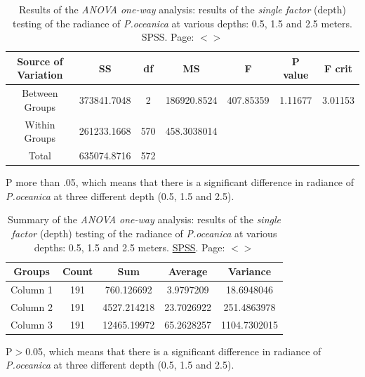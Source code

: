 \documentclass[11pt]{article}
\begin{document}
\begin{appendices}
\begin{table}[htbp]
	\caption{Results of the \textit{ANOVA one-way} analysis: results of the \textit{single factor} (depth) testing of the radiance of \textit{P.oceanica} at various depths: 0.5, 1.5 and 2.5 meters. \ac{SPSS}. Page: $<$\pageref{page-28}$>$}\label{tab:8}
	\begin{center}
	\begin{tabular}{|c|c|c|c|c|c|c|}
		\hline\hline
		\textbf{Source of Variation} & \textbf{SS} & \textbf{df} & \textbf{MS} & \textbf{F} & \textbf{P value} & \textbf{F crit} \\ \hline
		Between Groups & 373841.7048 & 2 & 186920.8524 & 407.85359 & 1.11677 & 3.01153 \\ \hline
		Within Groups & 261233.1668 & 570 & 458.3038014 & & & \\ \hline
		Total &  635074.8716 & 572 & & & & \\ \hline
	\end{tabular}
	\end{center} 
	P more than .05, which means that there is a significant difference in radiance of \textit{P.oceanica} at three different depth (0.5, 1.5 and 2.5). 
	
\end{table}

\begin{table}[htbp]
	\caption{Summary of the \textit{ANOVA one-way} analysis: results of the \textit{single factor} (depth) testing of the radiance of \textit{P.oceanica} at various depths: 0.5, 1.5 and 2.5 meters. \href{http://www.spss.com/}{SPSS}. Page: $<$\pageref{page-28}$>$}\label{tab:A.7}
	\begin{center}
	\begin{tabular}{|c|c|c|c|c|}
		\hline\hline
		\textbf{Groups} & \textbf{Count} & \textbf{Sum} & \textbf{Average} & \textbf{Variance} \\ \hline\hline
		Column 1 & 191 &	760.126692 & 3.9797209 & 18.6948046 \\ \hline
		Column 2 & 191 &	4527.214218 & 23.7026922  & 251.4863978 \\ \hline
		Column 3 & 191 &	12465.19972 & 65.2628257 & 1104.7302015 \\ \hline
	\end{tabular}
	\end{center}
	P$>$0.05, which means that there is a significant difference in radiance of \textit{P.oceanica} at three different depth (0.5, 1.5 and 2.5). 
 	

\end{table}
\end{appendices}
\end{document}
